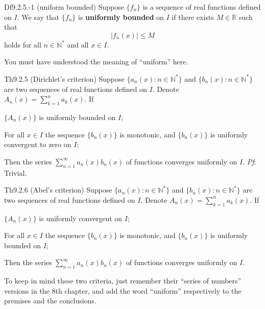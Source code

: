 \documentclass{article}
\begin{document}
\begin{Df}{Df9.2.5.-1 (uniform bounded)}
    Suppose $\{f_n\}$ is a sequence of real functions defined on $I$. We say that $\{f_n\}$ is \textbf{uniformly bounded} on $I$ if there exists $M\in\mathbb{R}$ such that
    $$ |f_n(x)| \leq M $$
    holds for all $n\in\mathbb{N}^\ast$ and all $x\in I$.
\end{Df}

\begin{Rmk}{}
    You must have understood the meaning of ``uniform'' here.
\end{Rmk}

\begin{Th}{Th9.2.5 (Dirichlet's criterion)}
    Suppose $\{a_n(x): n\in\mathbb{N}^\ast\}$ and $\{b_n(x): n\in\mathbb{N}^\ast\}$ are two sequences of real functions defined on $I$. Denote $A_n(x) = \sum_{k=1}^{n} a_k(x)$. If
    \begin{compactenum}
        \item $\{A_n(x)\}$ is uniformly bounded on $I$;
        \item For all $x\in I$ the sequence $\{b_n(x)\}$ is monotonic, and $\{b_n(x)\}$ is uniformly convergent to zero on $I$;
    \end{compactenum}
    Then the series $\sum_{n=1}^{\infty} a_n(x)b_n(x)$ of functions converges uniformly on $I$.
    \tcblower
    \textit{Pf}: Trivial.
\end{Th}

\begin{Th}{Th9.2.6 (Abel's criterion)}
    Suppose $\{a_n(x): n\in\mathbb{N}^\ast\}$ and $\{b_n(x): n\in\mathbb{N}^\ast\}$ are two sequences of real functions defined on $I$. Denote $A_n(x) = \sum_{k=1}^{n} a_k(x)$. If
    \begin{compactenum}
        \item $\{A_n(x)\}$ is uniformly convergent on $I$;
        \item For all $x\in I$ the sequence $\{b_n(x)\}$ is monotonic, and $\{b_n(x)\}$ is uniformly bounded on $I$;
    \end{compactenum}
    Then the series $\sum_{n=1}^{\infty} a_n(x)b_n(x)$ of functions converges uniformly on $I$.
\end{Th}

\begin{Rmk}{}
    To keep in mind these two criteria, just remember their ``series of numbers'' versions in the 8th chapter, and add the word ``uniform'' respectively to the premises and the conclusions.
\end{Rmk}
\end{document}
